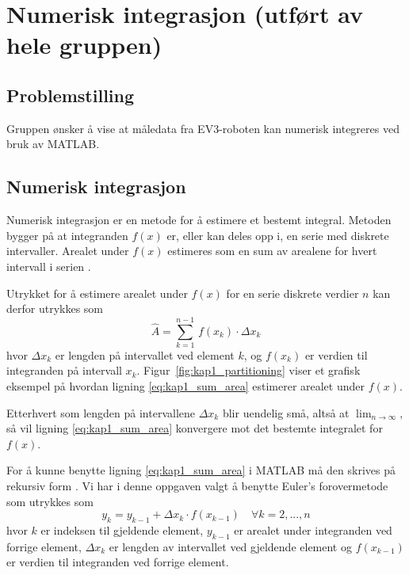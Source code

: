 \documentclass[main.tex]{subfiles}
\begin{document}
\chapter{Numerisk integrasjon (utført av hele gruppen) }\label{kap:integrasjon}

\section{Problemstilling}
Gruppen ønsker å vise at måledata fra \textsc{EV3}-roboten kan numerisk integreres ved bruk av \textsc{MATLAB}.

\section{Numerisk integrasjon}
Numerisk integrasjon er en metode for å estimere et bestemt integral. Metoden bygger på at integranden $f(x)$ er, eller kan deles opp i, en serie med diskrete intervaller. Arealet under $f(x)$ estimeres som en sum av arealene for hvert intervall i serien \parencite[s. 297–301]{AdaEss2017}.

Utrykket for å estimere arealet under $f(x)$ for en serie diskrete verdier $n$ kan derfor utrykkes som
\begin{equation}\label{eq:kap1_sum_area}
    \hat{A} =\sum_{k=1}^{n-1} \, f(x_k) \cdot \Delta x_k
\end{equation}
hvor $\Delta x_k$ er lengden på intervallet ved element $k$, og $f(x_k)$ er verdien til integranden på intervall $x_k$. Figur~\ref{fig:kap1_partitioning} viser et grafisk eksempel på hvordan ligning \eqref{eq:kap1_sum_area} estimerer arealet under $f(x)$.



Etterhvert som lengden på intervallene $\Delta x_k$ blir uendelig små, altså at $\lim_{n \to \infty}$, så vil ligning \eqref{eq:kap1_sum_area} konvergere mot det bestemte integralet for $f(x)$.

For å kunne benytte ligning \eqref{eq:kap1_sum_area} i \textsc{MATLAB} må den skrives på rekursiv form \parencite[s.~53–58]{Dre2023Simulink}. Vi har i denne oppgaven valgt å benytte Euler's forovermetode som utrykkes som
\begin{equation}\label{eq:kap1_area_rec}
    y_k = y_{k-1} + \Delta{x_k} \cdot f(x_{k-1}) \quad \forall k=2,..., n
\end{equation}
hvor $k$ er indeksen til gjeldende element, $y_{k-1}$ er arealet under integranden ved forrige element, $\Delta{x_k}$ er lengden av intervallet ved gjeldende element og $f(x_{k-1})$ er verdien til integranden ved forrige element.
\end{document}
